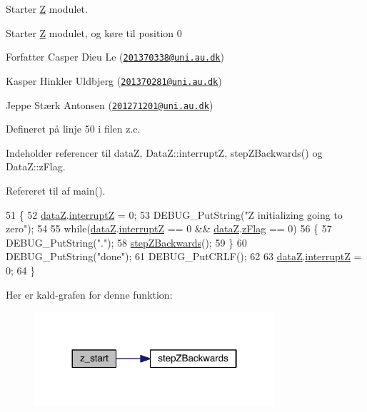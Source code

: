 Starter \hyperlink{class_z}{Z} modulet. 

Starter \hyperlink{class_z}{Z} modulet, og køre til position 0

\begin{DoxyAuthor}{Forfatter}
Casper Dieu Le (\href{mailto:201370338@uni.au.dk}{\tt 201370338@uni.\+au.\+dk}) 

Kasper Hinkler Uldbjerg (\href{mailto:201370281@uni.au.dk}{\tt 201370281@uni.\+au.\+dk}) 

Jeppe Stærk Antonsen (\href{mailto:201271201@uni.au.dk}{\tt 201271201@uni.\+au.\+dk}) 
\end{DoxyAuthor}


Defineret på linje 50 i filen z.\+c.



Indeholder referencer til dataZ, Data\+Z\+::interruptZ, step\+Z\+Backwards() og Data\+Z\+::z\+Flag.



Refereret til af main().


\begin{DoxyCode}
51 \{
52   \hyperlink{data_8h_ace1aa5b973b9358f7236c0c9deca9370}{dataZ}.\hyperlink{data_8h_ad31cb1c3240ac1f76fc3faa902b49c24}{interruptZ} = 0;
53   DEBUG\_PutString(\textcolor{stringliteral}{"Z initializing going to zero"});
54   
55   \textcolor{keywordflow}{while}(\hyperlink{data_8h_ace1aa5b973b9358f7236c0c9deca9370}{dataZ}.\hyperlink{data_8h_ad31cb1c3240ac1f76fc3faa902b49c24}{interruptZ} == 0 && \hyperlink{data_8h_ace1aa5b973b9358f7236c0c9deca9370}{dataZ}.\hyperlink{data_8h_ac9b1acf86d4646bdf8e9f338aedb56a2}{zFlag} == 0)
56   \{
57     DEBUG\_PutString(\textcolor{stringliteral}{"."});
58     \hyperlink{class_z_ad16ddc5261a237fc03c8a4b30571c528}{stepZBackwards}();
59   \}
60   DEBUG\_PutString(\textcolor{stringliteral}{"done"});
61   DEBUG\_PutCRLF();
62   
63   \hyperlink{data_8h_ace1aa5b973b9358f7236c0c9deca9370}{dataZ}.\hyperlink{data_8h_ad31cb1c3240ac1f76fc3faa902b49c24}{interruptZ} = 0;
64 \}
\end{DoxyCode}


Her er kald-\/grafen for denne funktion\+:
\nopagebreak
\begin{figure}[H]
\begin{center}
\leavevmode
\includegraphics[width=252pt]{d7/d97/class_z_affabc649bbf2e5dbeb475777391513d7_cgraph}
\end{center}
\end{figure}




